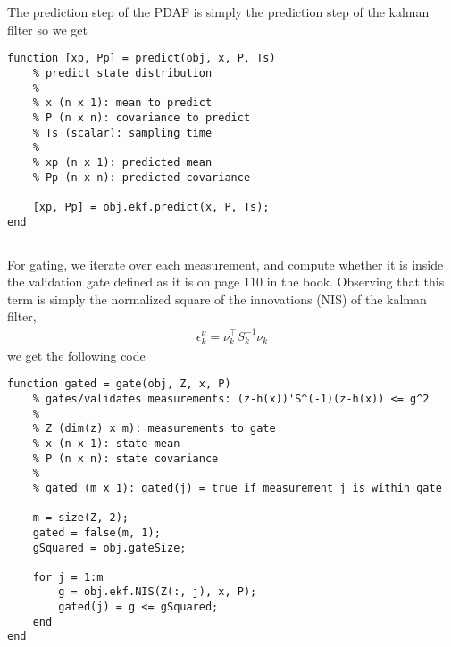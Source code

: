\documentclass[]{article}
\begin{document}
\section{}
\subsection{}
The prediction step of the PDAF is simply the prediction step of the kalman filter so we get
\begin{lstlisting}[caption={PDAF Predict}]
function [xp, Pp] = predict(obj, x, P, Ts)
    % predict state distribution
    %
    % x (n x 1): mean to predict
    % P (n x n): covariance to predict
    % Ts (scalar): sampling time
    %
    % xp (n x 1): predicted mean
    % Pp (n x n): predicted covariance

    [xp, Pp] = obj.ekf.predict(x, P, Ts);
end
\end{lstlisting}

\subsection{}
For gating, we iterate over each measurement, and compute whether it is inside the validation gate defined as it is on page 110 in the book. Observing that this term is simply the normalized square of the innovations (NIS) of the kalman filter,
\begin{equation}\begin{aligned}
\epsilon^\nu_k = \nu_k^\top S^{-1}_k \nu_k
\end{aligned}\end{equation}
we get the following code
\begin{lstlisting}[caption={PDAF gating function}]
function gated = gate(obj, Z, x, P)
    % gates/validates measurements: (z-h(x))'S^(-1)(z-h(x)) <= g^2
    %
    % Z (dim(z) x m): measurements to gate
    % x (n x 1): state mean
    % P (n x n): state covariance
    %
    % gated (m x 1): gated(j) = true if measurement j is within gate

    m = size(Z, 2);
    gated = false(m, 1);
    gSquared = obj.gateSize;

    for j = 1:m
        g = obj.ekf.NIS(Z(:, j), x, P);
        gated(j) = g <= gSquared;
    end
end
\end{lstlisting}
\end{document}
